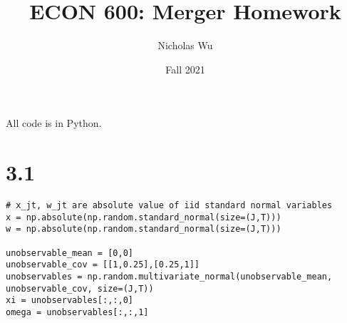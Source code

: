 \documentclass[10pt,letter]{article}
\begin{document}


\title{ECON 600: Merger Homework}

\author{Nicholas Wu}

\date{Fall 2021}

\maketitle

All code is in Python.

\section*{3.1}
\begin{lstlisting}
# x_jt, w_jt are absolute value of iid standard normal variables
x = np.absolute(np.random.standard_normal(size=(J,T)))
w = np.absolute(np.random.standard_normal(size=(J,T)))

unobservable_mean = [0,0]
unobservable_cov = [[1,0.25],[0.25,1]]
unobservables = np.random.multivariate_normal(unobservable_mean, unobservable_cov, size=(J,T))
xi = unobservables[:,:,0]
omega = unobservables[:,:,1]
\end{lstlisting}
\end{document}
